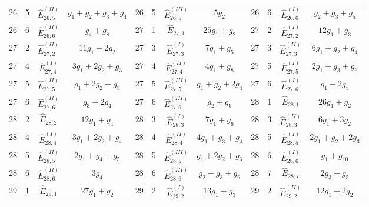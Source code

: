 \documentclass[a4paper,11pt]{article}
\begin{document}
\begin{table}
\begin{center}
{\begin{tabular}{|cccc|cccc|cccc|}
26  &  5  &  $\widehat{E}_{26,5}^{(II)}$  &  $g_{1}+g_{2}+g_{3}+g_{4}$    &    26  &  5  &  $\widehat{E}_{26,5}^{(III)}$  &  $5g_{2}$    &    26  &  6  &  $\widehat{E}_{26,6}^{(I)}$  &  $g_{2}+g_{3}+g_{5}$\\
26  &  6  &  $\widehat{E}_{26,6}^{(II)}$  &  $g_{4}+g_{8}$    &    27  &  1  &  $\widehat{E}_{27,1}$  &  $25g_{1}+g_{2}$    &    27  &  2  &  $\widehat{E}_{27,2}^{(I)}$  &  $12g_{1}+g_{3}$\\
27  &  2  &  $\widehat{E}_{27,2}^{(II)}$  &  $11g_{1}+2g_{2}$    &    27  &  3  &  $\widehat{E}_{27,3}^{(I)}$  &  $7g_{1}+g_{5}$    &    27  &  3  &  $\widehat{E}_{27,3}^{(II)}$  &  $6g_{1}+g_{2}+g_{4}$\\
27  &  4  &  $\widehat{E}_{27,4}^{(I)}$  &  $3g_{1}+2g_{2}+g_{3}$    &    27  &  4  &  $\widehat{E}_{27,4}^{(II)}$  &  $4g_{1}+g_{8}$    &    27  &  5  &  $\widehat{E}_{27,5}^{(I)}$  &  $2g_{1}+g_{3}+g_{6}$\\
27  &  5  &  $\widehat{E}_{27,5}^{(II)}$  &  $g_{1}+2g_{2}+g_{5}$    &    27  &  5  &  $\widehat{E}_{27,5}^{(III)}$  &  $g_{1}+g_{2}+2g_{4}$    &    27  &  6  &  $\widehat{E}_{27,6}^{(I)}$  &  $g_{1}+2g_{5}$\\
27  &  6  &  $\widehat{E}_{27,6}^{(II)}$  &  $g_{3}+2g_{4}$    &    27  &  6  &  $\widehat{E}_{27,6}^{(III)}$  &  $g_{2}+g_{9}$    &    28  &  1  &  $\widehat{E}_{28,1}$  &  $26g_{1}+g_{2}$\\
28  &  2  &  $\widehat{E}_{28,2}$  &  $12g_{1}+g_{4}$    &    28  &  3  &  $\widehat{E}_{28,3}^{(I)}$  &  $7g_{1}+g_{6}$    &    28  &  3  &  $\widehat{E}_{28,3}^{(II)}$  &  $6g_{1}+3g_{2}$\\
28  &  4  &  $\widehat{E}_{28,4}^{(I)}$  &  $3g_{1}+2g_{2}+g_{4}$    &    28  &  4  &  $\widehat{E}_{28,4}^{(II)}$  &  $4g_{1}+g_{3}+g_{4}$    &    28  &  5  &  $\widehat{E}_{28,5}^{(I)}$  &  $2g_{1}+g_{2}+2g_{3}$\\
28  &  5  &  $\widehat{E}_{28,5}^{(II)}$  &  $2g_{1}+g_{4}+g_{5}$    &    28  &  5  &  $\widehat{E}_{28,5}^{(III)}$  &  $g_{1}+2g_{2}+g_{6}$    &    28  &  6  &  $\widehat{E}_{28,6}^{(I)}$  &  $g_{1}+g_{10}$\\
28  &  6  &  $\widehat{E}_{28,6}^{(II)}$  &  $3g_{4}$    &    28  &  6  &  $\widehat{E}_{28,6}^{(III)}$  &  $g_{2}+g_{3}+g_{6}$    &    28  &  7  &  $\widehat{E}_{28,7}$  &  $2g_{3}+g_{5}$\\
29  &  1  &  $\widehat{E}_{29,1}$  &  $27g_{1}+g_{2}$    &    29  &  2  &  $\widehat{E}_{29,2}^{(I)}$  &  $13g_{1}+g_{3}$    &    29  &  2  &  $\widehat{E}_{29,2}^{(II)}$  &  $12g_{1}+2g_{2}$\\

\end{tabular}}
\end{center}
\end{table}
\end{document}
